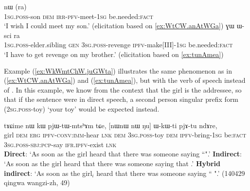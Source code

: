 \begin{exe}
\ex
\begin{xlist}
\ex \label{ex:WtCW.anAtWGa2}
\gll {} nɯ  (ra) \\
 \textsc{1sg}.\textsc{poss}-son \textsc{dem} \textsc{irr}-\textsc{pfv}-meet-\textsc{1sg} be.needed:\textsc{fact}\\
\glt `I wish I could meet my son.' (elicitation based on \ref{ex:WtCW.anAtWGa})
\ex \label{ex:tunAmea2}
\gll {} ɣɯ ɯ-sci  ra \\
 {\textsc{1sg}.\textsc{poss}-elder.sibling}  \textsc{gen} \textsc{3sg}.\textsc{poss}-revenge {\textsc{ipfv}-make[III]-\textsc{1sg}} be.needed:\textsc{fact}  \\
\glt `I have to get revenge on my brother.' (elicitation based on \ref{ex:tunAmea})
\end{xlist}
  \end{exe}
    
Example (\ref{ex:WkWmtChW.juGWta}) illustrates the same phenomenon as in (\ref{ex:WtCW.anAtWGa}) and (\ref{ex:tunAmea}), but with the verb of speech  instead of . In this example, we know from the context that the girl is the addressee, so that if the sentence were in direct speech, a second person singular prefix form  (\textsc{2sg}.\textsc{poss}-toy) `your toy' would be expected instead.
 
\begin{exe}
\ex \label{ex:WkWmtChW.juGWta}
\gll  tɤɕime nɯ kɯ pjɯ-tɯ-mtsʰɤm tɕe, [nɯnɯ  nɯ  	 ŋu] ɯ-kɯ-ti pjɤ-tu ndɤre, \\
girl \textsc{dem} \textsc{erg} \textsc{ipfv}-\textsc{conv}:\textsc{imm}-hear \textsc{lnk} \textsc{dem}  \textsc{3sg}.\textsc{poss}-toy  \textsc{dem}  \textsc{ipfv}-bring-\textsc{1sg}  be:\textsc{fact} \textsc{3sg}.\textsc{poss}-\textsc{sbj}:\textsc{pcp}-say \textsc{ifr}.\textsc{ipfv}-exist \textsc{lnk} \\
\glt   \textbf{Direct}: `As soon as the girl heard that there was someone saying ``".'
\glt   \textbf{Indirect}:  `As soon as the girl heard that there was someone saying that .'
\glt   \textbf{Hybrid indirect}: `As soon as the girl$_i$ heard that there was someone saying `` ".' (140429 qingwa wangzi-zh, 49)
\end{exe}


